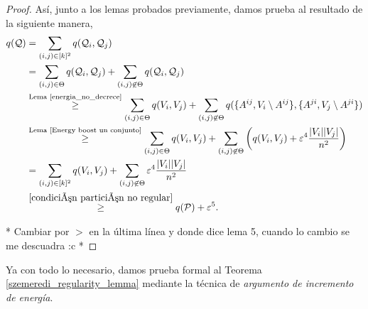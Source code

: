 \documentclass{article}[14pts]
\newcommand{\hh}[1]{{\color{red} * #1 *}}
\let\varepsilon=\varepsilon
\begin{document}
\begin{proof}
    Así, junto a los lemas probados previamente, damos prueba al resultado de la siguiente manera,
    \begin{align*}
        q(\mathcal{Q}) &= \sum_{(i,j)\in [k]^{2}} q(\mathcal{Q}_i, \mathcal{Q}_j) \\
        &= \sum_{(i,j)\in \Theta} q(\mathcal{Q}_i, \mathcal{Q}_j) + \sum_{(i,j)\not\in \Theta} q(\mathcal{Q}_i, \mathcal{Q}_j)\\
        &\overset{\text{Lema \ref{energia_no_decrece}}}{\geq} \sum_{(i,j)\in \Theta} q(V_i, V_j) + \sum_{(i,j)\not\in \Theta} q(\lbrace A^{ij}, V_i\setminus A^{ij}\rbrace, \lbrace A^{ji}, V_{j}\setminus A^{ji}\rbrace)\\
        &\overset{\text{Lema \ref{Energy boost un conjunto}}}{\geq} \sum_{(i,j)\in \Theta} q(V_i, V_j) + \sum_{(i,j)\not\in \Theta} \left( q(V_i, V_j) + \varepsilon^{4}\frac{|V_i||V_j|}{n^{2}} \right)\\
        &= \sum_{(i,j)\in [k]^{2}} q(V_i, V_j) + \sum_{(i,j)\not\in \Theta} \varepsilon^{4}\frac{|V_i||V_j|}{n^{2}}\\
        &\overset{\eqref{condición partición no regular}}{\geq} q(\mathcal{P}) + \varepsilon^{5}.
    \end{align*}

    \hh{Cambiar por $>$ en la última línea y donde dice lema 5, cuando lo cambio se me descuadra :c}
\end{proof}\medskip

Ya con todo lo necesario, damos prueba formal al Teorema \ref{szemeredi_regularity_lemma} mediante la técnica de \emph{argumento de incremento de energía}.\medskip
\end{document}
